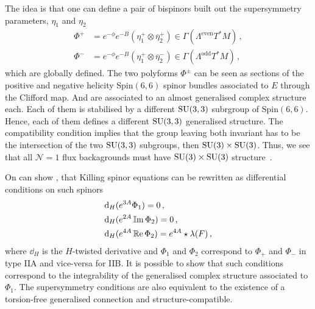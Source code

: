 \documentclass[debug]{phd}
\begin{document}
The idea is that one can define a pair of bispinors built out the 
supersymmetry parameters, $\eta_1$ and $\eta_2$ 
\begin{equation}
						\begin{split}
								\Phi^{+} & = e^{-\phi} e^{-B} \left(\eta_1^+ \otimes \overline{\eta}_2^+\right) \in \Gamma (\Lambda^{\mathrm{even}} T^*M) \, , \\
								\Phi^{-} & = e^{-\phi} e^{-B} \left(\eta_1^+ \otimes \overline{\eta}_2^-\right) \in \Gamma (\Lambda^{\mathrm{odd}} T^*M) \, ,
							\end{split}
\end{equation}
which are globally defined. The two polyforms $\Phi^{\pm}$ can be seen as sections of the positive and negative helicity $\mathrm{Spin}(6, 6)$ spinor bundles associated to $E$ through the Clifford map. And are associated to an almost generalised complex structure each. 
				Each of them is stabilised by a different $\mathrm{SU}(3,3)$ subrgroup of $\mathrm{Spin}(6, 6)$.
				Hence, each of them defines a different $\mathrm{SU}(3,3)$ generalised structure. The compatibility condition implies that the group leaving both invariant has to be the intersection of the two $\mathrm{SU}(3,3)$ subgroups, then $\mathrm{SU}(3) \times \mathrm{SU}(3)$.
				Thus, we see that all $\mathcal{N}=1$ flux backagrounds must have $\mathrm{SU}(3) \times \mathrm{SU}(3)$ structure~\cite{petrini2, Grana:2005sn}.
			
			
						On can show \cite{Grana:2006kf, petrini2}, that Killing spinor equations can be rewritten as differential conditions on such spinors 
							\begin{align}
									\label{susyeq1}
								& \mathrm{d}_H(e^{3A}\Phi_1)= 0 \, , \\
									\label{susyeq2a}
								& \mathrm{d}_H(e^{2A} \operatorname{\mathbb{I}m} \Phi_2) = 0 \, ,\\
\label{susyeq2b}
& \mathrm{d}_H (e^{4A} \operatorname{\mathbb{R}e} \Phi_2) = e^{4A} \star \lambda(F) \, ,
\end{align}
where $\dd_H$ is the $H$-twisted derivative and $\Phi_1$ and $\Phi_2$ correspond to $\Phi_+$ and $\Phi_-$ in type IIA and vice-versa for IIB.
It is possible to show that such conditions correspond to the integrability of the generalised complex structure associated to $\Phi_1$. 
The supersymmetry conditions are also equivalent to the existence of a torsion-free generalised connection and structure-compatible.


%				
%				
				
\end{document}
